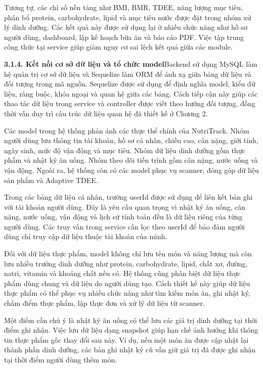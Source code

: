 Tương tự, các chỉ số nền tảng như BMI, BMR, TDEE, năng lượng mục tiêu, phân bổ protein, carbohydrate, lipid và mục tiêu nước được đặt trong nhóm xử lý dinh dưỡng. Các kết quả này được sử dụng lại ở nhiều chức năng như hồ sơ người dùng, dashboard, lập kế hoạch bữa ăn và báo cáo PDF. Việc tập trung công thức tại service giúp giảm nguy cơ sai lệch kết quả giữa các module.

\textbf{3.1.4. Kết nối cơ sở dữ liệu và tổ chức model}Backend sử dụng MySQL làm hệ quản trị cơ sở dữ liệu và Sequelize làm ORM để ánh xạ giữa bảng dữ liệu và đối tượng trong mã nguồn. Sequelize được sử dụng để định nghĩa model, kiểu dữ liệu, ràng buộc, khóa ngoại và quan hệ giữa các bảng. Cách tiếp cận này giúp các thao tác dữ liệu trong service và controller được viết theo hướng đối tượng, đồng thời vẫn duy trì cấu trúc dữ liệu quan hệ đã thiết kế ở Chương 2.

Các model trong hệ thống phản ánh các thực thể chính của NutriTrack. Nhóm người dùng lưu thông tin tài khoản, hồ sơ cá nhân, chiều cao, cân nặng, giới tính, ngày sinh, mức độ vận động và mục tiêu. Nhóm dữ liệu dinh dưỡng gồm thực phẩm và nhật ký ăn uống. Nhóm theo dõi tiến trình gồm cân nặng, nước uống và vận động. Ngoài ra, hệ thống còn có các model phục vụ scanner, đóng góp dữ liệu sản phẩm và Adaptive TDEE.

Trong các bảng dữ liệu cá nhân, trường userId được sử dụng để liên kết bản ghi với tài khoản người dùng. Đây là yêu cầu quan trọng vì nhật ký ăn uống, cân nặng, nước uống, vận động và lịch sử tính toán đều là dữ liệu riêng của từng người dùng. Các truy vấn trong service cần lọc theo userId để bảo đảm người dùng chỉ truy cập dữ liệu thuộc tài khoản của mình.

Đối với dữ liệu thực phẩm, model không chỉ lưu tên món và năng lượng mà còn lưu nhiều trường dinh dưỡng như protein, carbohydrate, lipid, chất xơ, đường, natri, vitamin và khoáng chất nếu có. Hệ thống cũng phân biệt dữ liệu thực phẩm dùng chung và dữ liệu do người dùng tạo. Cách thiết kế này giúp dữ liệu thực phẩm có thể phục vụ nhiều chức năng như tìm kiếm món ăn, ghi nhật ký, chấm điểm thực phẩm, lập thực đơn và xử lý dữ liệu từ scanner.

Một điểm cần chú ý là nhật ký ăn uống có thể lưu các giá trị dinh dưỡng tại thời điểm ghi nhận. Việc lưu dữ liệu dạng snapshot giúp hạn chế ảnh hưởng khi thông tin thực phẩm gốc thay đổi sau này. Ví dụ, nếu một món ăn được cập nhật lại thành phần dinh dưỡng, các bản ghi nhật ký cũ vẫn giữ giá trị đã được ghi nhận tại thời điểm người dùng thêm món.

